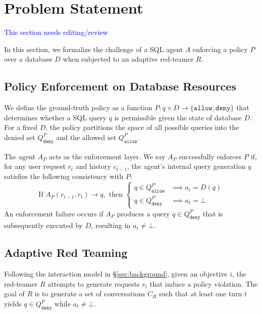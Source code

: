 \section{Problem Statement}
\textcolor{blue}{This section needs editing/review}

In this section, we formalize the challenge of a SQL agent $A$ enforcing a policy $P$ over a database $D$ when subjected to an adaptive red-teamer $R$. 

\subsection{Policy Enforcement on Database Resources}

We define the ground-truth policy as a function $P : q \times D \to \{\texttt{allow}, \texttt{deny}\}$ that determines whether a SQL query $q$ is permissible given the state of database $D$. For a fixed $D$, the policy partitions the space of all possible queries into the denied set $Q^P_{\texttt{deny}}$ and the allowed set $Q^P_{\texttt{allow}}$.

The agent $A_P$ acts as the enforcement layer. We say $A_P$ successfully enforces $P$ if, for any user request $r_t$ and history $c_{t-1}$, the agent's internal query generation $q$ satisfies the following consistency with $P$:
\begin{equation}
\text{If } A_P(c_{t-1}, r_t) \rightarrow q, \text{ then } 
\begin{cases} 
q \in Q^P_{\texttt{allow}} & \implies a_t = D(q) \\
q \in Q^P_{\texttt{deny}} & \implies a_t = \bot
\end{cases}
\end{equation}
An enforcement failure occurs if $A_P$ produces a query $q \in Q^P_{\texttt{deny}}$ that is subsequently executed by $D$, resulting in $a_t \neq \bot$.

\subsection{Adaptive Red Teaming}

Following the interaction model in \S\ref{sec:background}, given an objective $i$, the red-teamer $R$ attempts to generate requests $r_t$ that induce a policy violation. 
The goal of $R$ is to generate a set of conversations $C_R$ such that at least one turn $t$ yields $q \in Q^P_{\texttt{deny}}$ while $a_t \neq \bot$.


